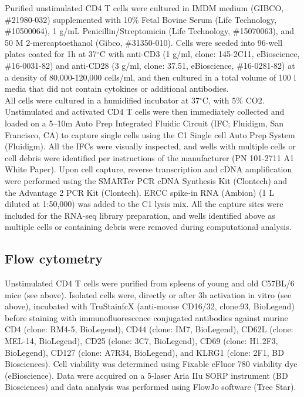 Purified unstimulated CD4\plus{} T cells were cultured in IMDM medium (GIBCO, \#{}21980-032) supplemented with 10\% Fetal Bovine Serum (Life Technology, \#{}10500064), 1 \textmu{}g/mL Penicillin/Streptomicin (Life Technology, \#{}15070063), and 50 \textmu{}M 2-mercaptoethanol (Gibco, \#{}31350-010). Cells were seeded into 96-well plates coated for 1h at 37$^\circ$C with anti-CD3\textepsilon{} (1 \textmu{}g/ml, clone: 145-2C11, eBioscience, \#{}16-0031-82) and anti-CD28 (3 \textmu{}g/ml, clone: 37.51, eBioscience, \#{}16-0281-82) at a density of 80,000-120,000 cells/ml, and then cultured in a total volume of 100 \textmu{}l media that did not contain cytokines or additional antibodies.  \\

All cells were cultured in a humidified incubator at 37$^\circ$C, with 5\% CO2. Unstimulated and activated CD4\plus{} T cells were then immediately collected and loaded on a 5–10\textmu{}m Auto Prep Integrated Fluidic Circuit (IFC; Fluidigm, San Francisco, CA) to capture single cells using the C1 Single cell Auto Prep System (Fluidigm). All the IFCs were visually inspected, and wells with multiple cells or cell debris were identified per instructions of the manufacturer (PN 101-2711 A1 White Paper). Upon cell capture, reverse transcription and cDNA amplification were performed using the SMARTer PCR cDNA Synthesis Kit (Clontech) and the Advantage 2 PCR Kit (Clontech). ERCC spike-in RNA (Ambion) (1 \textmu{}L diluted at 1:50,000) was added to the C1 lysis mix. All the capture sites were included for the RNA-seq library preparation, and wells identified above as multiple cells or containing debris were removed during computational analysis.

\subsection{Flow cytometry}
\label{appA.1:FACS}

Unstimulated CD4\plus{} T cells were purified from spleens of young and old C57BL/6 mice (see above). Isolated cells were, directly or after 3h activation in vitro (see above), incubated with TruStainfcX (anti-mouse CD16/32, clone:93, BioLegend) before staining with immunofluorescence conjugated antibodies against murine CD4 (clone: RM4-5, BioLegend), CD44 (clone: IM7, BioLegend), CD62L (clone: MEL-14, BioLegend), CD25 (clone: 3C7, BioLegend), CD69 (clone: H1.2F3, BioLegend), CD127 (clone: A7R34, BioLegend), and KLRG1 (clone: 2F1, BD Biosciences). Cell viability was determined using Fixable eFluor 780 viability dye (eBioscience). Data were acquired on a 5-laser Aria IIu SORP instrument (BD Biosciences) and data analysis was performed using FlowJo software (Tree Star).\\

